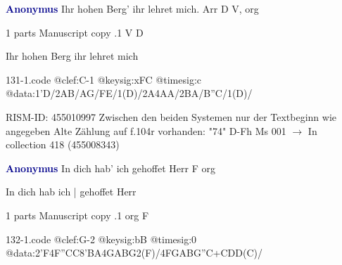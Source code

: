 \documentclass[twocolumn]{book}
\begin{document}
\newline \par \vspace{7pt} \textcolor{darkblue}{\textbf{Anonymus  }}
\newline Ihr hohen Berg' ihr lehret mich. Arr  D  
\newline V, org
\newline \begin{itshape}\end{itshape} 
\newline \textcolor{darkblue}{}  1 parts  
\newline Manuscript copy
.1  V  D
\newline \begin{footnotesize} Ihr hohen Berg ihr lehret mich \end{footnotesize}  
\begin{filecontents*}{131-1.code}
@clef:C-1
@keysig:xFC
@timesig:c
@data:1'D/2AB/AG/FE/1(D)/2A4AA/2BA/B''C/1(D)/
\end{filecontents*}
\newline
%

\newline RISM-ID: 455010997
\newline Zwischen den beiden Systemen nur der Textbeginn wie angegeben
\newline Alte Zählung auf f.104r vorhanden: "74"
\newline D-Fh  Ms 001
\newline $\rightarrow$ In collection 418 (455008343)

\newline \par \vspace{7pt} \textcolor{darkblue}{\textbf{Anonymus  }}
\newline In dich hab' ich gehoffet Herr  F  
\newline org
\newline \begin{itshape}[f.19v, at left:] In dich hab ich | gehoffet Herr\end{itshape} 
\newline \textcolor{darkblue}{}  1 parts  
\newline Manuscript copy
.1  org  F  
\begin{filecontents*}{132-1.code}
@clef:G-2
@keysig:bB
@timesig:0
@data:2'F4F''CC{8'BA}4GABG2(F)/4FGABG''C+CDD(C)/
\end{filecontents*}
\newline
%
\end{document}
